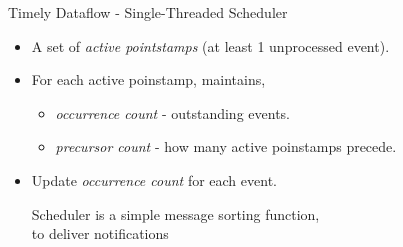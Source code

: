 \begin{frame}[t]{Timely Dataflow - Single-Threaded Scheduler}
  \vspace{0.15cm}

  \begin{itemize}
    \item A set of \emph{active pointstamps} (at least 1 unprocessed event).
    \vspace{0.15cm}
    \item For each active poinstamp, maintains,
    \begin{itemize}
       \item \emph{occurrence count} - outstanding events.
       \item \emph{precursor count} - how many active poinstamps precede.
    \end{itemize}
    \vspace{0.15cm}
    \item Update \emph{occurrence count} for each event.
    \vspace{0.15cm}
    
    \pause
    \begin{exampleblock}{}
      \vspace{0.15cm}
      \begin{center}
        Scheduler is a simple message sorting function,\\
        to deliver notifications
      \end{center}
      \vspace{0.15cm}
    \end{exampleblock}
  \end{itemize}

\end{frame}

